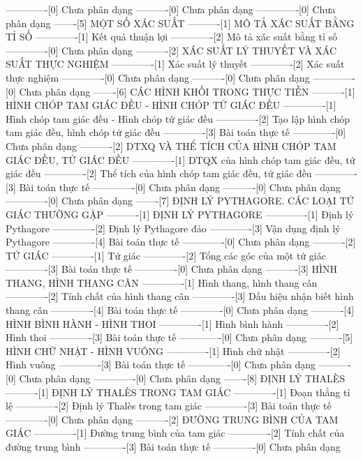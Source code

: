 -------------[0] Chưa phân dạng
----------[0] Chưa phân dạng
-------------[0] Chưa phân dạng
-------[5] MỘT SỐ XÁC SUẤT
----------[1] MÔ TẢ XÁC SUẤT BẰNG TỈ SỐ
-------------[1] Kết quả thuận lợi
-------------[2] Mô tả xác suất bằng tỉ số
-------------[0] Chưa phân dạng
----------[2] XÁC SUẤT LÝ THUYẾT VÀ XÁC SUẤT THỰC NGHIỆM
-------------[1] Xác suất lý thuyết
-------------[2] Xác suất thực nghiệm
-------------[0] Chưa phân dạng
----------[0] Chưa phân dạng
-------------[0] Chưa phân dạng
-------[6] CÁC HÌNH KHỐI TRONG THỰC TIỄN
----------[1] HÌNH CHÓP TAM GIÁC ĐỀU - HÌNH CHÓP TỨ GIÁC ĐỀU
-------------[1] Hình chóp tam giác đều - Hình chóp tứ giác đều
-------------[2] Tạo lập hình chóp tam giác đều, hình chóp tứ giác đều
-------------[3] Bài toán thực tế
-------------[0] Chưa phân dạng
----------[2] DTXQ VÀ THỂ TÍCH CỦA HÌNH CHÓP TAM GIÁC ĐỀU, TỨ GIÁC ĐỀU
-------------[1] DTQX của hình chóp tam giác đều, tứ giác đều
-------------[2] Thể tích của hình chóp tam giác đều, tứ giác đều
-------------[3] Bài toán thực tế
-------------[0] Chưa phân dạng
----------[0] Chưa phân dạng
-------------[0] Chưa phân dạng
-------[7] ĐỊNH LÝ PYTHAGORE. CÁC LOẠI TỨ GIÁC THƯỜNG GẶP
----------[1] ĐỊNH LÝ PYTHAGORE
-------------[1] Định lý Pythagore
-------------[2] Định lý Pythagore đảo
-------------[3] Vận dụng định lý Pythagore
-------------[4] Bài toán thực tế
-------------[0] Chưa phân dạng
----------[2] TỨ GIÁC
-------------[1] Tứ giác
-------------[2] Tổng các góc của một tứ giác
-------------[3] Bài toán thực tế
-------------[0] Chưa phân dạng
----------[3] HÌNH THANG, HÌNH THANG CÂN
-------------[1] Hình thang, hình thang cân
-------------[2] Tính chất của hình thang cân
-------------[3] Dấu hiệu nhận biết hình thang cân
-------------[4] Bài toán thực tế
-------------[0] Chưa phân dạng
----------[4] HÌNH BÌNH HÀNH - HÌNH THOI
-------------[1] Hình bình hành
-------------[2] Hình thoi
-------------[3] Bài toán thực tế
-------------[0] Chưa phân dạng
----------[5] HÌNH CHỮ NHẬT - HÌNH VUÔNG
-------------[1] Hình chữ nhật
-------------[2] Hình vuông
-------------[3] Bài toán thực tế
-------------[0] Chưa phân dạng
----------[0] Chưa phân dạng
-------------[0] Chưa phân dạng
-------[8] ĐỊNH LÝ THALÈS
----------[1] ĐỊNH LÝ THALÈS TRONG TAM GIÁC
-------------[1] Đoạn thẳng tỉ lệ
-------------[2] Định lý Thalès trong tam giác
-------------[3] Bài toán thực tế
-------------[0] Chưa phân dạng
----------[2] ĐƯỜNG TRUNG BÌNH CỦA TAM GIÁC
-------------[1] Đường trung bình của tam giác
-------------[2] Tính chất của đường trung bình
-------------[3] Bài toán thực tế
-------------[0] Chưa phân dạng
